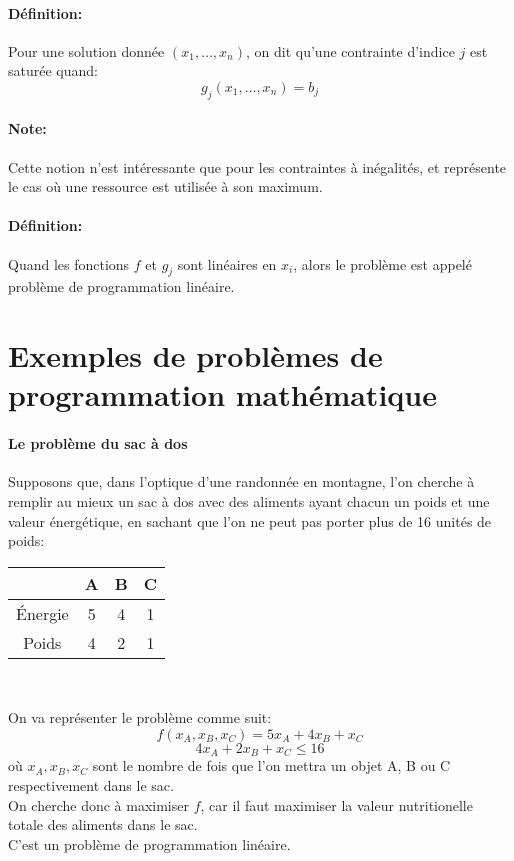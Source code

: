 \documentclass[a4paper]{report}
\begin{document}
\paragraph{Définition:}
Pour une solution donnée \((x_1,\dots,x_n)\), on dit qu'une contrainte
d'indice \(j\) est saturée quand:
\[g_j(x_1,\dots,x_n)=b_j\]

\paragraph{Note:}
Cette notion n'est intéressante que pour les contraintes à inégalités, et représente le cas où une ressource est utilisée à son maximum.

\paragraph{Définition:}
Quand les fonctions \(f\) et \(g_j\) sont linéaires en \(x_i\), alors le
problème est appelé problème de programmation linéaire.

\section{Exemples de problèmes de programmation mathématique}
\paragraph{Le problème du sac à dos} Supposons que, dans l'optique d'une
randonnée en montagne, l'on cherche à remplir au mieux un sac à dos avec des
aliments ayant chacun un poids et une valeur énergétique, en sachant que l'on ne
peut pas porter plus de 16 unités de poids:
\begin{center}
\begin{tabular}{|c|c|c|c|}
\hline
 & A & B & C \\
\hline
Énergie & 5 & 4 & 1 \\
\hline
Poids & 4 & 2 & 1 \\
\hline
\end{tabular}
\\
\end{center}
On va représenter le problème comme suit:
\[f(x_A, x_B, x_C) =5x_A + 4x_B + x_C\]
\[4x_A + 2x_B + x_C \le 16\]
où \(x_A,x_B,x_C\) sont le nombre de fois que l'on mettra un objet A, B ou C
respectivement dans le sac.\\
On cherche donc à maximiser \(f\), car il faut maximiser la valeur nutritionelle
totale des aliments dans le sac.\\
C'est un problème de programmation linéaire.
\end{document}
